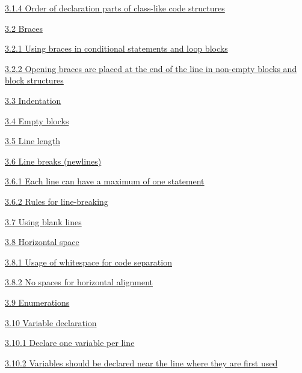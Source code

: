 \hspace{1.0cm}\hyperref[sec:3.1.4]{ 3.1.4 Order of declaration parts of class-like code structures}

\hspace{0.5cm}\hyperref[sec:3.2]{ 3.2 Braces}

\hspace{1.0cm}\hyperref[sec:3.2.1]{ 3.2.1 Using braces in conditional statements and loop blocks}

\hspace{1.0cm}\hyperref[sec:3.2.2]{ 3.2.2 Opening braces are placed at the end of the line in non-empty blocks and block structures}

\hspace{0.5cm}\hyperref[sec:3.3]{ 3.3 Indentation}

\hspace{0.5cm}\hyperref[sec:3.4]{ 3.4 Empty blocks}

\hspace{0.5cm}\hyperref[sec:3.5]{ 3.5 Line length}

\hspace{0.5cm}\hyperref[sec:3.6]{ 3.6 Line breaks (newlines)}

\hspace{1.0cm}\hyperref[sec:3.6.1]{ 3.6.1 Each line can have a maximum of one statement}

\hspace{1.0cm}\hyperref[sec:3.6.2]{ 3.6.2 Rules for line-breaking}

\hspace{0.5cm}\hyperref[sec:3.7]{ 3.7 Using blank lines}

\hspace{0.5cm}\hyperref[sec:3.8]{ 3.8 Horizontal space}

\hspace{1.0cm}\hyperref[sec:3.8.1]{ 3.8.1 Usage of whitespace for code separation}

\hspace{1.0cm}\hyperref[sec:3.8.2]{ 3.8.2 No spaces for horizontal alignment}

\hspace{0.5cm}\hyperref[sec:3.9]{ 3.9 Enumerations}

\hspace{0.5cm}\hyperref[sec:3.10]{ 3.10 Variable declaration}

\hspace{1.0cm}\hyperref[sec:3.10.1]{ 3.10.1 Declare one variable per line}

\hspace{1.0cm}\hyperref[sec:3.10.2]{ 3.10.2 Variables should be declared near the line where they are first used}

